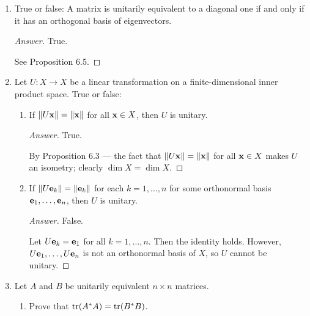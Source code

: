 \documentclass[../psets.tex]{subfiles}
\begin{document}
\begin{enumerate}[label={\textbf{6.\arabic*.}}]
\begin{proof}[Answer]
\begin{equation*}
\begin{pmatrix}
                0 & -2 & 0\\
                0 & 0 & 4\\
            \end{pmatrix}
            \begin{pmatrix}
                -1/\sqrt{2} & 1/\sqrt{2} & 0\\
                -1/\sqrt{6} & -1/\sqrt{6} & \sqrt{6}/3\\
                1/\sqrt{3} & 1/\sqrt{3} & 1/\sqrt{3}\\
            \end{pmatrix}
        \end{equation*}
    \end{proof}
    \item True or false: A matrix is unitarily equivalent to a diagonal one if and only if it has an orthogonal basis of eigenvectors.
    \begin{proof}[Answer]
        True.\par
        See Proposition 6.5.
    \end{proof}
    \setcounter{enumi}{4}
    \item Let $U:X\to X$ be a linear transformation on a finite-dimensional inner product space. True or false:
    \begin{enumerate}
        \item If $\norm{U\mathbf{x}}=\norm{\mathbf{x}}$ for all $\mathbf{x}\in X$, then $U$ is unitary.
        \begin{proof}[Answer]
            True.\par
            By Proposition 6.3 --- the fact that $\norm{U\mathbf{x}}=\norm{\mathbf{x}}$ for all $\mathbf{x}\in X$ makes $U$ an isometry; clearly $\dim X=\dim X$.
        \end{proof}
        \item If $\norm{U\mathbf{e}_k}=\norm{\mathbf{e}_k}$ for each $k=1,\dots,n$ for some orthonormal basis $\mathbf{e}_1,\dots,\mathbf{e}_n$, then $U$ is unitary.
        \begin{proof}[Answer]
            False.\par
            Let $U\mathbf{e}_k=\mathbf{e}_1$ for all $k=1,\dots,n$. Then the identity holds. However, $U\mathbf{e}_1,\dots,U\mathbf{e}_n$ is not an orthonormal basis of $X$, so $U$ cannot be unitary.
        \end{proof}
    \end{enumerate}
    \item Let $A$ and $B$ be unitarily equivalent $n\times n$ matrices.
    \begin{enumerate}
        \item Prove that $\trace(A^*A)=\trace(B^*B)$.

\end{enumerate}
\end{enumerate}
\end{document}
